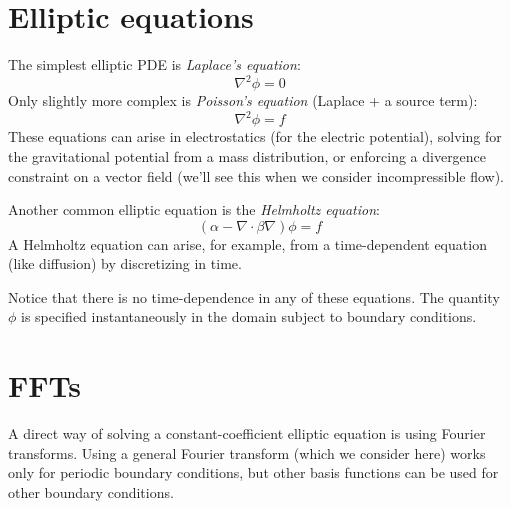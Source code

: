 \label{ch:multigrid}

\begin{quote}
\end{quote}

\section{Elliptic equations}

The simplest elliptic PDE is {\em Laplace's equation}:
\begin{equation}
\nabla^2 \phi = 0
\end{equation}
Only slightly more complex is {\em Poisson's equation} (Laplace + a source term):
\begin{equation}
\nabla^2 \phi = f
\end{equation}
These equations can arise in electrostatics (for the electric potential),
solving for the gravitational potential from a mass distribution, or
enforcing a divergence constraint on a vector field (we'll see this
when we consider incompressible flow).

Another common elliptic equation is the {\em Helmholtz equation}:
\begin{equation}
(\alpha - \nabla \cdot \beta \nabla) \phi = f
\end{equation}
A Helmholtz equation can arise, for example, from a time-dependent
equation (like diffusion) by discretizing in time.

Notice that there is no time-dependence in any of these equations.
The quantity $\phi$ is specified instantaneously in the domain subject to
boundary conditions.

\section{FFTs}

A direct way of solving a constant-coefficient elliptic equation
is using Fourier transforms.  Using a general Fourier transform
(which we consider here) works only for periodic boundary conditions,
but other basis functions can be used for other boundary conditions.

